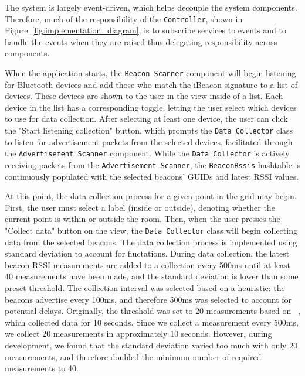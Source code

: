 
The system is largely event-driven, which helps decouple the system components. 
Therefore, much of the responsibility of the \texttt{Controller}, shown in Figure~\ref{fig:implementation_diagram}, is to subscribe services to events and to handle the events when they are raised thus delegating responsibility across components. 

When the application starts, the \texttt{Beacon Scanner} component will begin listening for Bluetooth devices and add those who match the iBeacon signature to a list of devices.
These devices are shown to the user in the view inside of a list.
Each device in the list has a corresponding toggle, letting the user select which devices to use for data collection.
After selecting at least one device, the user can click the "Start listening collection" button, which prompts the \texttt{Data Collector} class to listen for advertisement packets from the selected devices, facilitated through the \texttt{Advertisement Scanner} component. 
While the \texttt{Data Collector} is actively receiving packets from the \texttt{Advertisement Scanner}, the \texttt{BeaconRssis} hashtable is continuously populated with the selected beacons' GUIDs and latest RSSI values.


At this point, the data collection process for a given point in the grid may begin.
First, the user must select a label (inside or outside), denoting whether the current point is within or outside the room.
Then, when the user presses the "Collect data" button on the view, the \texttt{Data Collector} class will begin collecting data from the selected beacons.
The data collection process is implemented using standard deviation to account for fluctations.
During data collection, the latest beacon RSSI measurements are added to a collection every 500ms until at least 40 measurements have been made, and the standard deviation is lower than some preset threshold.
The collection interval was selected based on a heuristic: the beacons advertise every 100ms, and therefore 500ms was selected to account for potential delays.
Originally, the threshold was set to 20 measurements based on \citeauthor{improving_indoor_localization}~\cite{improving_indoor_localization}, which collected data for 10 seconds.
Since we collect a measurement every 500ms, we collect 20 measurements in approximately 10 seconds. However, during development, we found that the standard deviation varied too much with only 20 measurements, and therefore doubled the minimum number of required measurements to 40.

